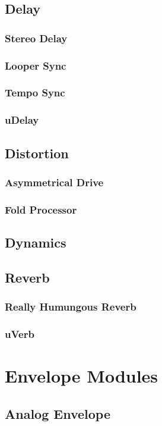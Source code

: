 \documentclass[11pt]{book}
\begin{document}
\section{Delay}
\subsection{Stereo Delay}
\subsection{Looper Sync}
\subsection{Tempo Sync}
\subsection{uDelay}
\section{Distortion}
\subsection{Asymmetrical Drive}
\subsection{Fold Processor}
\section{Dynamics}
\section{Reverb}
\subsection{Really Humungous Reverb}
\subsection{uVerb}

\chapter{Envelope Modules}
\section{Analog Envelope}
\end{document}
